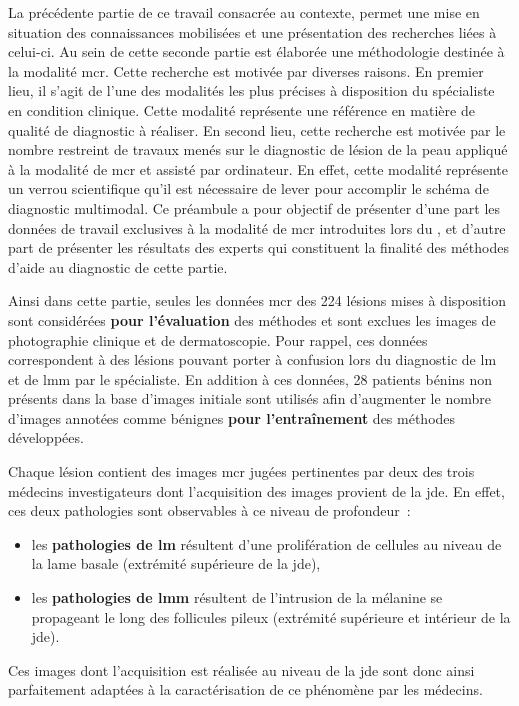 \renewcommand{\thechapter}{\roman{chapter}}
\setcounter{chapter}{2}
\setcounter{figure}{0}

\label{chap:preamble_microscopy}
La précédente partie de ce travail consacrée au contexte, permet une mise en situation des connaissances mobilisées et une présentation des recherches liées à celui-ci. Au sein de cette seconde partie est élaborée une méthodologie destinée à la modalité \acrlong{mcr}. Cette recherche est motivée par diverses raisons. En premier lieu, il s'agit de l'une des modalités les plus précises à disposition du spécialiste en condition clinique. Cette modalité représente une référence en matière de qualité de diagnostic à réaliser. En second lieu, cette recherche est motivée par le nombre restreint de travaux menés sur le diagnostic de lésion de la peau appliqué à la modalité de \gls{mcr} et assisté par ordinateur. En effet, cette modalité représente un verrou scientifique qu'il est nécessaire de lever pour accomplir le schéma de diagnostic multimodal. Ce préambule a pour objectif de présenter d'une part les données de travail exclusives à la modalité de \gls{mcr} introduites lors du , et d'autre part de présenter les résultats des experts qui constituent la finalité des méthodes d'aide au diagnostic de cette partie.\par

Ainsi dans cette partie, seules les données \gls{mcr} des 224 lésions mises à disposition sont considérées \textbf{pour l'évaluation} des méthodes et sont exclues les images de photographie clinique et de dermatoscopie. Pour rappel, ces données correspondent à des lésions pouvant porter à confusion lors du diagnostic de \gls{lm} et de \gls{lmm} par le spécialiste. En addition à ces données, 28 patients bénins non présents dans la base d'images initiale sont utilisés afin d'augmenter le nombre d'images annotées comme bénignes \textbf{pour l'entraînement} des méthodes développées.\par

Chaque lésion contient des images \gls{mcr} jugées pertinentes par deux des trois médecins investigateurs dont l'acquisition des images provient de la \gls{jde}. En effet, ces deux pathologies sont observables à ce niveau de profondeur~:
\begin{itemize}
    \item les \textbf{pathologies de \gls{lm}} résultent d'une prolifération de cellules au niveau de la lame basale (extrémité supérieure de la \gls{jde}),
    \item les \textbf{pathologies de \gls{lmm}} résultent de l'intrusion de la mélanine se propageant le long des follicules pileux (extrémité supérieure et intérieur de la \gls{jde}).
\end{itemize} Ces images dont l'acquisition est réalisée au niveau de la \gls{jde} sont donc ainsi parfaitement adaptées à la caractérisation de ce phénomène par les médecins.\par

